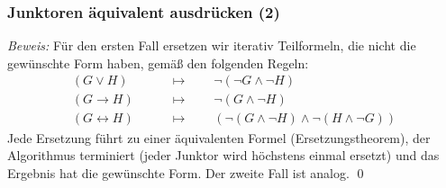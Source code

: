 \documentclass[aspectratio=1610,onlymath]{beamer}
\begin{document}
\begin{frame}\frametitle{Junktoren äquivalent ausdrücken (2)}


\pause

\emph{Beweis:} Für den ersten Fall ersetzen wir iterativ Teilformeln, die nicht die gewünschte Form haben, gemäß den folgenden Regeln:
\begin{align*}
(G\vee H) &\qquad\mapsto\qquad \neg(\neg G\wedge\neg H)\\
(G\to H) &\qquad\mapsto\qquad\neg (G\wedge\neg H)\\
(G\leftrightarrow H) &\qquad\mapsto\qquad (\neg (G\wedge\neg H)\wedge\neg (H\wedge\neg G))
\end{align*}
Jede Ersetzung führt zu einer äquivalenten Formel (Ersetzungstheorem), der Algorithmus terminiert (jeder Junktor wird höchstens einmal ersetzt) und das Ergebnis hat die gewünschte Form.
% 
Der zweite Fall ist analog.
\qed

\end{frame}
\end{document}
